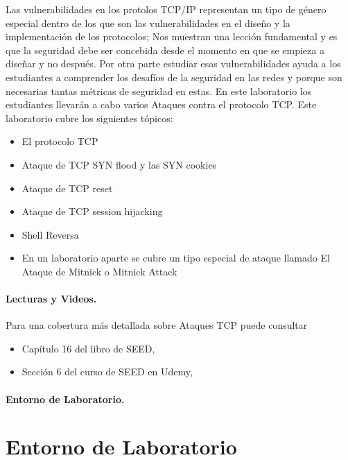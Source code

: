 Las vulnerabilidades en los protolos TCP/IP representan un tipo de género especial dentro de los que son las vulnerabilidades en el diseño y la implementación de los protocolos; Nos muestran una lección fundamental y es que la seguridad debe ser concebida desde el momento en que se empieza a diseñar y no después. Por otra parte estudiar esas vulnerabilidades ayuda a los estudiantes a comprender los desafíos de la seguridad en las redes y porque son necesarias tantas métricas de seguridad en estas.
En este laboratorio los estudiantes llevarán a cabo varios Ataques contra el protocolo TCP.
Este laboratorio cubre los siguientes tópicos:

\begin{itemize}[noitemsep]
\item El protocolo TCP
\item Ataque de TCP SYN flood y las SYN cookies 
\item Ataque de TCP reset 
\item Ataque de TCP session hijacking
\item Shell Reversa
\item En un laboratorio aparte se cubre un tipo especial de ataque llamado El Ataque de Mitnick o Mitnick Attack
\end{itemize}


\paragraph{Lecturas y Videos.}
Para una cobertura más detallada sobre Ataques TCP puede consultar

\begin{itemize}
\item Capítulo 16 del libro de SEED, \seedbook
\item Sección 6 del curso de SEED en Udemy, \seedisvideo
\end{itemize}


\paragraph{Entorno de Laboratorio.} \seedenvironmentC



\section{Entorno de Laboratorio}

